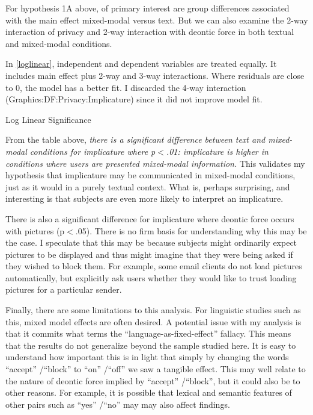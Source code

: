 For hypothesis 1A above, of primary interest are group differences associated with the main effect mixed-modal versus text. But we can also examine the 2-way interaction of privacy and 2-way interaction with deontic force in both textual and mixed-modal conditions.

\begin{sloppier}
In \autoref{loglinear}, independent and dependent variables are treated equally. It includes main effect plus 2-way and 3-way interactions. Where residuals are close to 0, the model has a better fit. I discarded the 4-way interaction (Graphics:DF:Privacy:Implicature) since it did not improve model fit. 
\end{sloppier}

\begin{table}
\caption{Log Linear Significance}
\centering

\label{loglinear}
\end{table}


From the table above, \emph{there is a significant difference between text and mixed-modal conditions for implicature where p$<$.01: implicature is higher in conditions where users are presented mixed-modal information.} This validates my hypothesis that implicature may be communicated in mixed-modal conditions, just as it would in a purely textual context. What is, perhaps surprising, and interesting is that subjects are even more likely to interpret an implicature.

There is also a significant difference for implicature where deontic force occurs with pictures (p$<$.05). There is no firm basis for understanding why this may be the case. I speculate that this may be because subjects might ordinarily expect pictures to be displayed and thus might imagine that they were being asked if they wished to block them. For example, some email clients do not load pictures automatically, but explicitly ask users whether they would like to trust loading pictures for a particular sender.

Finally, there are some limitations to this analysis. For linguistic studies such as this, mixed model effects are often desired. A potential issue with my analysis is that it commits what  \citet{Clark:1973vn}  terms the ``language-as-fixed-effect'' fallacy. This means that the results do not generalize beyond the sample studied here. It is easy to understand how important this is in light that simply by changing the words ``accept'' \slash  ``block'' to ``on'' \slash  ``off'' we saw a tangible effect. This may well relate to the nature of deontic force implied by ``accept'' \slash  ``block'', but it could also be to other reasons. For example, it is possible that lexical and semantic features of other pairs such as ``yes'' \slash  ``no'' may may also affect findings.

